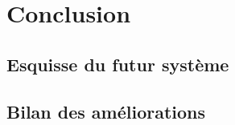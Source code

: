 \section{Conclusion}

\subsection{Esquisse du futur système}
%

\subsection{Bilan des améliorations}
